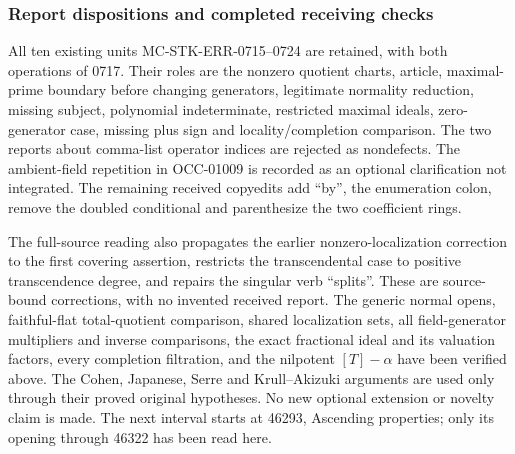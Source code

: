 \subsubsection{Report dispositions and completed receiving checks}\label{report-dispositions-and-completed-receiving-checks}

All ten existing units MC-STK-ERR-0715--0724 are retained, with both operations of 0717. Their roles are the nonzero quotient charts, article, maximal-prime boundary before changing generators, legitimate normality reduction, missing subject, polynomial indeterminate, restricted maximal ideals, zero-generator case, missing plus sign and locality/completion comparison. The two reports about comma-list operator indices are rejected as nondefects. The ambient-field repetition in OCC-01009 is recorded as an optional clarification not integrated. The remaining received copyedits add ``by'', the enumeration colon, remove the doubled conditional and parenthesize the two coefficient rings.

The full-source reading also propagates the earlier nonzero-localization correction to the first covering assertion, restricts the transcendental case to positive transcendence degree, and repairs the singular verb ``splits''. These are source-bound corrections, with no invented received report. The generic normal opens, faithful-flat total-quotient comparison, shared localization sets, all field-generator multipliers and inverse comparisons, the exact fractional ideal and its valuation factors, every completion filtration, and the nilpotent \([T]-\alpha\) have been verified above. The Cohen, Japanese, Serre and Krull--Akizuki arguments are used only through their proved original hypotheses. No new optional extension or novelty claim is made. The next interval starts at 46293, Ascending properties; only its opening through 46322 has been read here.
